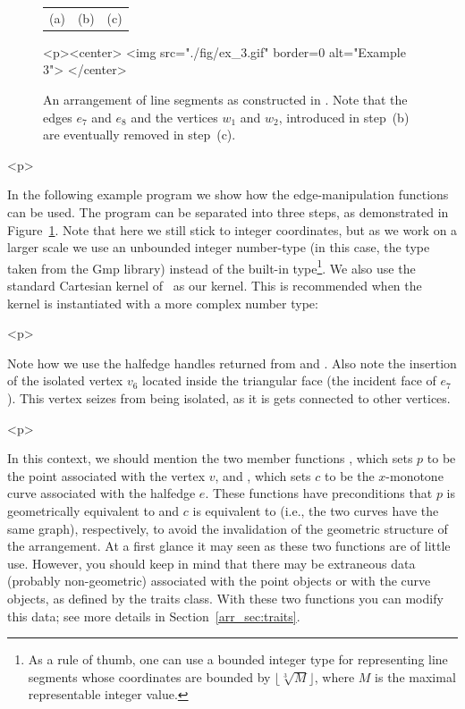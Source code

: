 \begin{figure}[!htp]
\begin{ccTexOnly}
\begin{center}
\begin{tabular}{ccc}
  {\small (a)} & {\small (b)} & {\small (c)}\\
  \end{tabular}
  \end{center}
\end{ccTexOnly}
\begin{ccHtmlOnly}
  <p><center>
  <img src="./fig/ex_3.gif" border=0 alt="Example 3">
  </center>
\end{ccHtmlOnly}
\caption{An arrangement of line segments as constructed
in . Note that the edges $e_7$ and $e_8$ and the
vertices $w_1$ and $w_2$, introduced in step~(b) are eventually
removed in step~(c).}
\label{arr_fig:ex_3}
\end{figure}

\begin{ccHtmlOnly}<p>\end{ccHtmlOnly}
In the following example program we show how the edge-manipulation
functions can be used. The program can be separated into three
steps, as demonstrated in Figure~\ref{arr_fig:ex_3}. Note that
here we still stick to integer coordinates, but as we work on a
larger scale we use an unbounded integer number-type (in this
case, the  type taken from the {\sc Gmp} library)
instead of the built-in  type\footnote{As a rule of
thumb, one can use a bounded integer type for representing line
segments whose coordinates are bounded by
$\lfloor\sqrt[3]{M}\rfloor$, where $M$ is the maximal
representable integer value.}. We also use the standard Cartesian
kernel of \cgal\ as our kernel. This is recommended when the
kernel is instantiated with a more complex number type:


\begin{ccHtmlOnly}<p>\end{ccHtmlOnly}
Note how we use the halfedge handles returned from
 and . Also note the insertion
of the isolated vertex $v_6$ located inside the triangular face (the
incident face of $e_7$). This vertex seizes from being isolated, as it
is gets connected to other vertices.

\begin{ccHtmlOnly}<p>\end{ccHtmlOnly}
In this context, we should mention the two member functions
, which sets $p$ to be the point
associated with the vertex $v$, and , which
sets $c$ to be the $x$-monotone curve associated with the halfedge
$e$. These functions have preconditions that $p$ is
geometrically equivalent to  and $c$ is equivalent
to  (i.e., the two curves have the same graph),
respectively, to avoid the invalidation of the geometric structure of
the arrangement. At a first glance it may seen as these two functions
are of little use. However, you should keep in mind that there may be
extraneous data (probably non-geometric) associated with the point
objects or with the curve objects, as defined by the traits class. With
these two functions you can modify this data; see more details in
Section~\ref{arr_sec:traits}.

